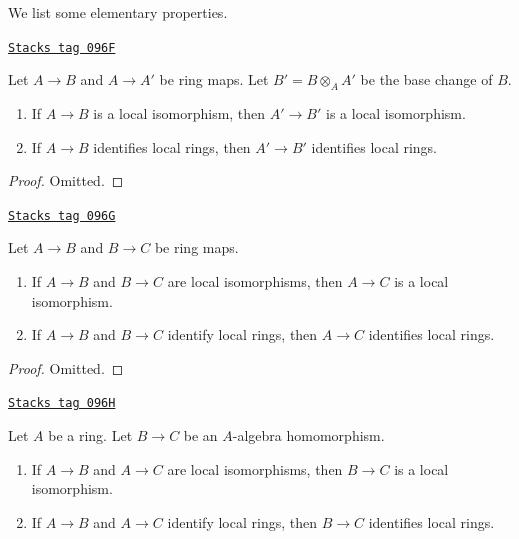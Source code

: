We list some elementary properties.

\begin{lemma}
\label{proetale-lemma-base-change-local-isomorphism}
\href{https://stacks.math.columbia.edu/tag/096F}{\texttt{Stacks tag 096F}}

Let $A \to B$ and $A \to A'$ be ring maps. Let $B' = B \otimes_A A'$
be the base change of $B$.
\begin{enumerate}
\item If $A \to B$ is a local isomorphism, then $A' \to B'$ is a
local isomorphism.
\item If $A \to B$ identifies local rings, then $A' \to B'$
identifies local rings.
\end{enumerate}
\end{lemma}

\begin{proof}
Omitted.
\end{proof}

\begin{lemma}
\label{proetale-lemma-composition-local-isomorphism}
\href{https://stacks.math.columbia.edu/tag/096G}{\texttt{Stacks tag 096G}}

Let $A \to B$ and $B \to C$ be ring maps.
\begin{enumerate}
\item If $A \to B$ and $B \to C$ are local isomorphisms, then $A \to C$
is a local isomorphism.
\item If $A \to B$ and $B \to C$ identify local rings, then $A \to C$
identifies local rings.
\end{enumerate}
\end{lemma}

\begin{proof}
Omitted.
\end{proof}

\begin{lemma}
\label{proetale-lemma-local-isomorphism-permanence}
\href{https://stacks.math.columbia.edu/tag/096H}{\texttt{Stacks tag 096H}}

Let $A$ be a ring. Let $B \to C$ be an $A$-algebra homomorphism.
\begin{enumerate}
\item If $A \to B$ and $A \to C$ are local isomorphisms, then $B \to C$
is a local isomorphism.
\item If $A \to B$ and $A \to C$ identify local rings, then $B \to C$
identifies local rings.
\end{enumerate}
\end{lemma}

